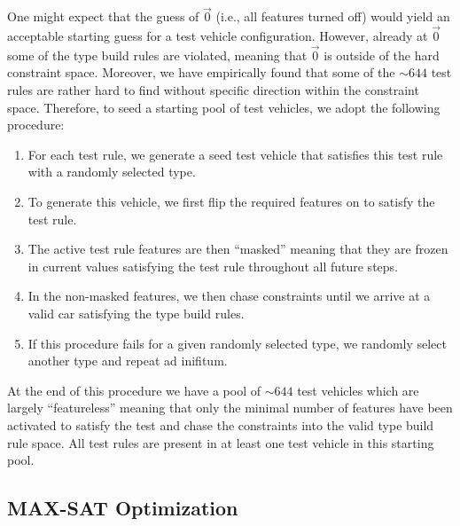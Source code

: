 \documentclass[aps,prl,twocolumn,superscriptaddress,groupedaddress]{revtex4}  %
\begin{document}
One might expect that the guess of $\vec 0$ (i.e., all features turned off)
would yield an acceptable starting guess for a test vehicle configuration.
However, already at $\vec 0$ some of the type build rules are violated, meaning
that $\vec 0$ is outside of the hard constraint space. Moreover, we have
empirically found that some of the $\sim 644$ test rules are rather hard to find
without specific direction within the constraint space. Therefore, to seed a
starting pool of test vehicles, we adopt the following procedure:
\begin{enumerate}
\item For each test rule, we generate a seed test vehicle that satisfies this
test rule with a randomly selected type.
\item To generate this vehicle, we first flip the required features on to
satisfy the test rule. 
\item The active test rule features are then ``masked'' meaning that they are
frozen in current values satisfying the test rule throughout all future steps.
\item In the non-masked features, we then chase constraints until we arrive at a
valid car satisfying the type build rules.
\item If this procedure fails for a given randomly selected type, we randomly
select another type and repeat ad inifitum.
\end{enumerate}
At the end of this procedure we have a pool of $\sim 644$ test vehicles which
are largely ``featureless'' meaning that only the minimal number of features
have been activated to satisfy the test and chase the constraints into the valid
type build rule space. All test rules are present in at least one test vehicle in this
starting pool.

\subsection{MAX-SAT Optimization}
\end{document}
